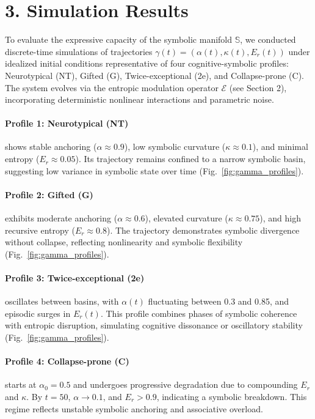 \section*{3. Simulation Results}

To evaluate the expressive capacity of the symbolic manifold $\mathbb{S}$, we conducted discrete-time simulations of trajectories $\gamma(t) = (\alpha(t), \kappa(t), E_r(t))$ under idealized initial conditions representative of four cognitive-symbolic profiles: Neurotypical (NT), Gifted (G), Twice-exceptional (2e), and Collapse-prone (C). The system evolves via the entropic modulation operator $\mathcal{E}$ (see Section 2), incorporating deterministic nonlinear interactions and parametric noise.

\paragraph{Profile 1: Neurotypical (NT)} shows stable anchoring ($\alpha \approx 0.9$), low symbolic curvature ($\kappa \approx 0.1$), and minimal entropy ($E_r \approx 0.05$). Its trajectory remains confined to a narrow symbolic basin, suggesting low variance in symbolic state over time (Fig.~\ref{fig:gamma_profiles}).

\paragraph{Profile 2: Gifted (G)} exhibits moderate anchoring ($\alpha \approx 0.6$), elevated curvature ($\kappa \approx 0.75$), and high recursive entropy ($E_r \approx 0.8$). The trajectory demonstrates symbolic divergence without collapse, reflecting nonlinearity and symbolic flexibility (Fig.~\ref{fig:gamma_profiles}).

\paragraph{Profile 3: Twice-exceptional (2e)} oscillates between basins, with $\alpha(t)$ fluctuating between 0.3 and 0.85, and episodic surges in $E_r(t)$. This profile combines phases of symbolic coherence with entropic disruption, simulating cognitive dissonance or oscillatory stability (Fig.~\ref{fig:gamma_profiles}).

\paragraph{Profile 4: Collapse-prone (C)} starts at $\alpha_0 = 0.5$ and undergoes progressive degradation due to compounding $E_r$ and $\kappa$. By $t = 50$, $\alpha \rightarrow 0.1$, and $E_r > 0.9$, indicating a symbolic breakdown. This regime reflects unstable symbolic anchoring and associative overload.

